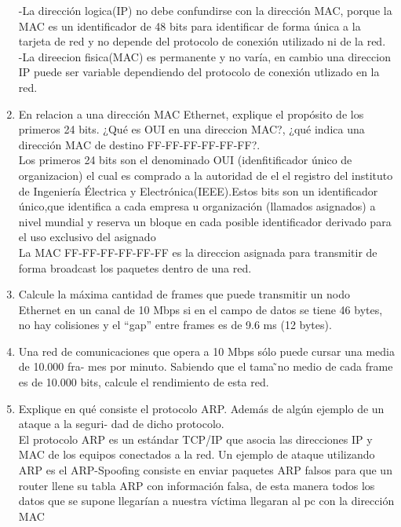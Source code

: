 \documentclass{udparticle}
\begin{document}
\begin{enumerate}
    -La dirección logica(IP) no debe confundirse con la dirección MAC, porque la MAC es un identificador de 48 bits para identificar 
    de forma única  a la tarjeta de red y no depende del protocolo de conexión utilizado ni de la red.\\
    -La direecion fisica(MAC) es permanente y no varía, en cambio una direccion IP puede ser variable dependiendo del protocolo
    de conexión utlizado en la red.\\

    \item En relacion a una dirección MAC Ethernet, explique el propósito de los primeros 24 bits. ¿Qué es OUI en una direccion MAC?,
    ¿qué indica una dirección MAC de destino FF-FF-FF-FF-FF-FF?.\\
    Los primeros 24 bits son el denominado OUI (idenfitificador único de organizacion) el cual es comprado a la autoridad de el 
    el registro del instituto de Ingeniería Électrica y Electrónica(IEEE).Estos bits son un  identificador único,que identifica a 
    cada empresa u organización (llamados asignados) a nivel mundial y reserva un bloque en cada posible identificador derivado para 
    el uso exclusivo del asignado\\
    La  MAC FF-FF-FF-FF-FF-FF es la direccion asignada para transmitir de forma broadcast los paquetes dentro de una red.\\
    \item Calcule la máxima cantidad de frames que puede transmitir un nodo Ethernet en un canal de 10
    Mbps si en el campo de datos se tiene 46 bytes, no hay colisiones y el “gap” entre frames es de
    9.6 ms (12 bytes).\\
    \item Una red de comunicaciones que opera a 10 Mbps sólo puede cursar una media de 10.000 fra-
    mes por minuto. Sabiendo que el tama ̃no medio de cada frame es de 10.000 bits, calcule el
    rendimiento de esta red.\\
    \item Explique en qué consiste el protocolo ARP. Además de algún ejemplo de un ataque a la seguri-
    dad de dicho protocolo.\\
    El protocolo ARP es un estándar TCP/IP que asocia las direcciones IP y MAC de los equipos conectados a la red. Un ejemplo de
    ataque utilizando ARP es el ARP-Spoofing consiste en enviar paquetes ARP falsos para que un router llene su tabla ARP con
    información falsa, de esta manera todos los datos que se supone llegarían a nuestra víctima llegaran al pc con la dirección MAC

\end{enumerate}
\end{document}
